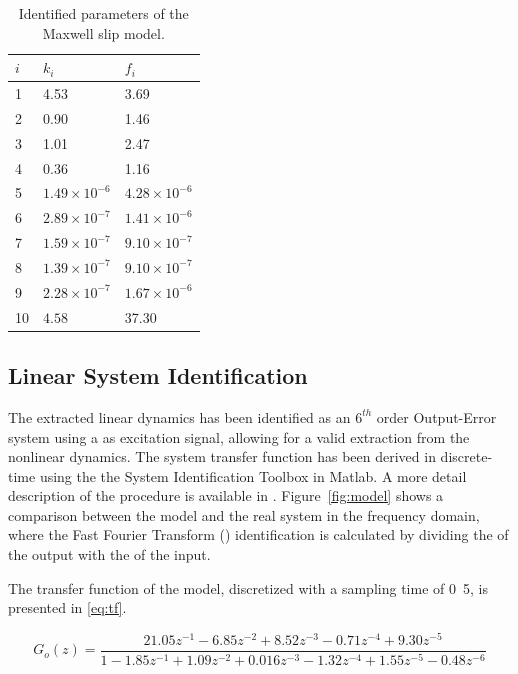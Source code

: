 \begin{table}[h!]
  \centering
  \begin{tabular}{| l | l | l |}
    \hline
    $i$ & $k_i$ & $f_i$ \\ \hline
    1 & 4.53 & 3.69 \\
    2 & 0.90 & 1.46 \\
    3 & 1.01 & 2.47 \\
    4 & 0.36 & 1.16 \\
    5 & $1.49 \times 10^{-6}$ & $4.28 \times 10^{-6}$ \\
    6 & $2.89 \times 10^{-7}$ & $1.41 \times 10^{-6}$ \\
    7 & $1.59 \times 10^{-7}$ & $9.10 \times 10^{-7}$ \\
    8 & $1.39 \times 10^{-7}$ & $9.10 \times 10^{-7}$ \\
    9 & $2.28 \times 10^{-7}$ & $1.67 \times 10^{-6}$ \\
    10 & $4.58$ & 37.30 \\
    \hline
  \end{tabular}
  \caption{\label{tab:maxwell} Identified parameters of the Maxwell slip model.}
\end{table}

\subsection{Linear System Identification}
\label{sec:linsys}
The extracted linear dynamics has been identified as an $6^{th}$ order Output-Error system using a \abbrPRBS as excitation signal, allowing for a valid extraction from the nonlinear dynamics. The system transfer function has been derived in discrete-time using the the System Identification Toolbox in Matlab. A more detail description of the procedure is available in \citep{ButcherController:2015}. Figure~\ref{fig:model} shows a comparison between the model and the real system in the frequency domain, where the Fast Fourier Transform (\abbrFFT) identification is calculated by dividing the \abbrFFT of the output with the \abbrFFT of the input.

 The transfer function of the model, discretized with a sampling time of \unit{0.5}{\milli\second}, is presented in \eqref{eq:tf}.

\begin{equation}
  \label{eq:tf}
  G_o(z) = \frac{21.05z^{-1} - 6.85z^{-2} + 8.52z^{-3} - 0.71z^{-4} + 9.30z^{-5}}{1 - 1.85z^{-1} + 1.09z^{-2} + 0.016z^{-3} - 1.32z^{-4} + 1.55z^{-5} - 0.48z^{-6}}
\end{equation}

